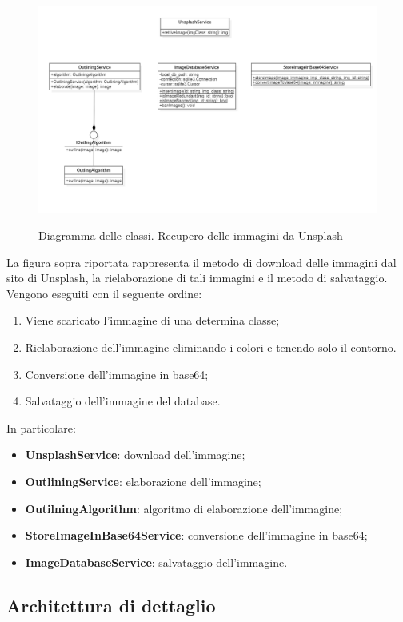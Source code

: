 \begin{figure}[H]
    \centering
    \includegraphics[scale = 0.6]{img/downloadImg.png}\\
    \caption{Diagramma delle classi. Recupero delle immagini da Unsplash}
\end{figure}

La figura sopra riportata rappresenta il metodo di download delle immagini dal sito di Unsplash, la rielaborazione di tali immagini e il metodo di salvataggio. Vengono eseguiti con il seguente ordine:
\begin{enumerate}
    \item Viene scaricato l'immagine di una determina classe;
    \item Rielaborazione dell'immagine eliminando i colori e tenendo solo il contorno.
    \item Conversione dell'immagine in base64;
    \item Salvataggio dell'immagine del database.
\end{enumerate}

In particolare:
\begin{itemize}
    \item \textbf{UnsplashService}: download dell'immagine;
    \item \textbf{OutliningService}: elaborazione dell'immagine;
    \item \textbf{OutilningAlgorithm}: algoritmo di elaborazione dell'immagine;
    \item \textbf{StoreImageInBase64Service}: conversione dell'immagine in base64;
    \item \textbf{ImageDatabaseService}: salvataggio dell'immagine.
\end{itemize}

\subsection{Architettura di dettaglio}


